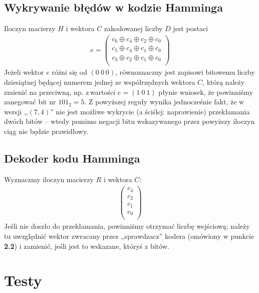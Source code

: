 \documentclass[a4paper,11pt]{article}
\begin{document}
  \subsection{Wykrywanie błędów w kodzie Hamminga}
  Iloczyn macierzy $H$ i wektora $C$ zakodowanej liczby $D$ jest postaci
  \begin{gather*}
    e = \begin{pmatrix}
      c_6 \oplus c_4 \oplus c_2 \oplus c_0 \\
      c_5 \oplus c_4 \oplus c_1 \oplus c_0 \\
      c_3 \oplus c_2 \oplus c_1 \oplus c_0 \\
    \end{pmatrix}
  \end{gather*}
  Jeżeli wektor $e$ różni się od $(0\ 0\ 0)$, równoznaczny jest zapisowi bitowemu liczby dziesiątnej będącej numerem jednej ze współrzędnych wektora $C$, którą należy zmienić na przeciwną, np. z\,wartości $e = (1\ 0\ 1)$ płynie wniosek, że powinniśmy zanegować bit nr $101_2=5$.
  Z powyższej reguły wynika jednocześnie fakt, że w wersji ,,$(7,4)$'' nie jest możliwe wykrycie (a ściślej: naprawienie) przekłamania dwóch bitów -- wtedy pomimo negacji bitu wskazywanego przez powyższy iloczyn ciąg nie będzie prawidłowy.
  \subsection{Dekoder kodu Hamminga}
  Wyznaczmy iloczyn macierzy $R$ i wektora $C$:
  \begin{gather*}
    \begin{pmatrix}
      c_4 \\
      c_2 \\
      c_1 \\
      c_0 \\
    \end{pmatrix}
  \end{gather*}
  Jeśli nie doszło do przekłamania, powinniśmy otrzymać liczbę wejściową; należy tu uwzględnić wektor zwracany przez ,,sprawdzacz'' kodera (omówiony w punkcie \textbf{2.2}) i zamienić, jeśli jest to wskazane, któryś z bitów.

  \section{Testy}
\end{document}
